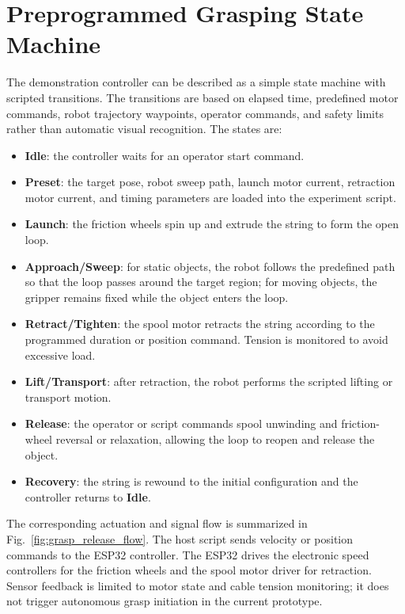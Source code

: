 \section{Preprogrammed Grasping State Machine}
The demonstration controller can be described as a simple state machine with scripted transitions. The transitions are based on elapsed time, predefined motor commands, robot trajectory waypoints, operator commands, and safety limits rather than automatic visual recognition. The states are:
\begin{itemize}
    \item \textbf{Idle}: the controller waits for an operator start command.
    \item \textbf{Preset}: the target pose, robot sweep path, launch motor current, retraction motor current, and timing parameters are loaded into the experiment script.
    \item \textbf{Launch}: the friction wheels spin up and extrude the string to form the open loop.
    \item \textbf{Approach/Sweep}: for static objects, the robot follows the predefined path so that the loop passes around the target region; for moving objects, the gripper remains fixed while the object enters the loop.
    \item \textbf{Retract/Tighten}: the spool motor retracts the string according to the programmed duration or position command. Tension is monitored to avoid excessive load.
    \item \textbf{Lift/Transport}: after retraction, the robot performs the scripted lifting or transport motion.
    \item \textbf{Release}: the operator or script commands spool unwinding and friction-wheel reversal or relaxation, allowing the loop to reopen and release the object.
    \item \textbf{Recovery}: the string is rewound to the initial configuration and the controller returns to \textbf{Idle}.
\end{itemize}

The corresponding actuation and signal flow is summarized in Fig.~\ref{fig:grasp_release_flow}. The host script sends velocity or position commands to the ESP32 controller. The ESP32 drives the electronic speed controllers for the friction wheels and the spool motor driver for retraction. Sensor feedback is limited to motor state and cable tension monitoring; it does not trigger autonomous grasp initiation in the current prototype.

